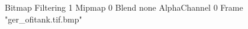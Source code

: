 {Bitmap
	{Filtering 1}
	{Mipmap 0}
	{Blend none}
	{AlphaChannel 0}
	{Frame "ger_ofitank.tif.bmp"}
}
